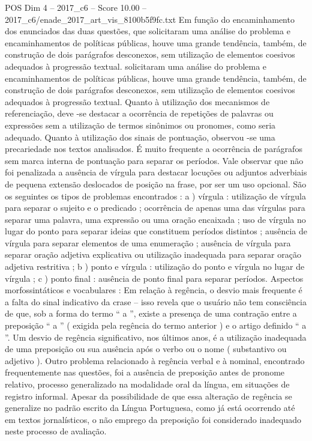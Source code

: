 \begin{textsample}{POS Dim 4 – 2017\_c6 – Score 10.00 – 2017\_c6/enade\_2017\_art\_vis\_8100b5f9fc.txt}
Em função do encaminhamento dos enunciados das duas questões, que solicitaram uma análise do problema e encaminhamentos de políticas públicas, houve uma grande tendência, também, de construção de dois parágrafos desconexos, sem utilização de elementos coesivos adequados à progressão textual. solicitaram uma análise do problema e encaminhamentos de políticas públicas, houve uma grande tendência, também, de construção de dois parágrafos desconexos, sem utilização de elementos coesivos adequados à progressão textual.
Quanto à utilização dos mecanismos de referenciação, deve -se destacar a ocorrência de repetições de palavras ou expressões sem a utilização de termos sinônimos ou pronomes, como seria adequado.
Quanto à utilização dos sinais de pontuação, observou -se uma precariedade nos textos analisados.
É muito frequente a ocorrência de parágrafos sem marca interna de pontuação para separar os períodos.
Vale observar que não foi penalizada a ausência de vírgula para destacar locuções ou adjuntos adverbiais de pequena extensão deslocados de posição na frase, por ser um uso opcional.
São os seguintes os tipos de problemas encontrados : a ) vírgula : utilização de vírgula para separar o sujeito e o predicado ; ocorrência de apenas uma das vírgulas para separar uma palavra, uma expressão ou uma oração encaixada ; uso de vírgula no lugar do ponto para separar ideias que constituem períodos distintos ; ausência de vírgula para separar elementos de uma enumeração ; ausência de vírgula para separar oração adjetiva explicativa ou utilização inadequada para separar oração adjetiva restritiva ; b ) ponto e vírgula : utilização do ponto e vírgula no lugar de vírgula ; c ) ponto final : ausência de ponto final para separar períodos.
Aspectos morfossintáticos e vocabulares : Em relação à regência, o desvio mais frequente é a falta do sinal indicativo da crase – isso revela que o usuário não tem consciência de que, sob a forma do termo “ a ”, existe a presença de uma contração entre a preposição “ a ” ( exigida pela regência do termo anterior ) e o artigo definido “ a ”.
Um desvio de regência significativo, nos últimos anos, é a utilização inadequada de uma preposição ou sua ausência após o verbo ou o nome ( substantivo ou adjetivo ).
Outro problema relacionado à regência verbal e à nominal, encontrado frequentemente nas questões, foi a ausência de preposição antes de pronome relativo, processo generalizado na modalidade oral da língua, em situações de registro informal.
Apesar da possibilidade de que essa alteração de regência se generalize no padrão escrito da Língua Portuguesa, como já está ocorrendo até em textos jornalísticos, o não emprego da preposição foi considerado inadequado neste processo de avaliação.

\end{textsample}
